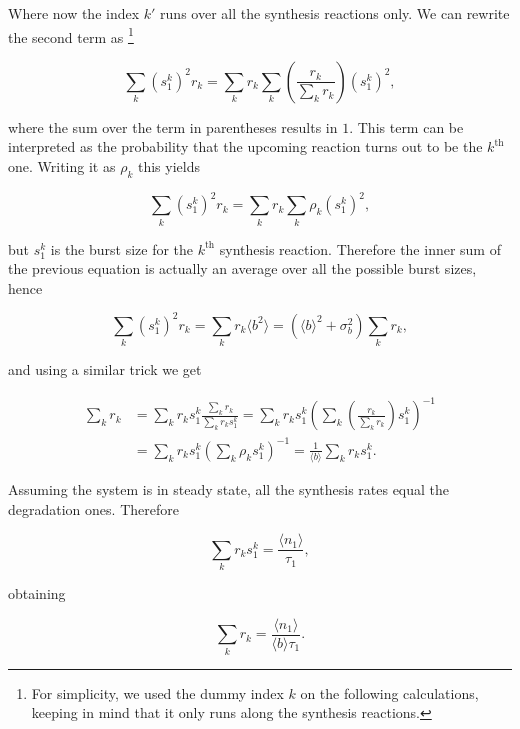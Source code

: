 Where now the index $k'$ runs over all the synthesis reactions only. We can rewrite the second term as \footnote{For simplicity, we used the dummy index $k$ on the following calculations, keeping in mind that it only runs along the synthesis reactions.}

\begin{equation*}
  \sum_k(s_1^k)^2r_k=\sum_kr_k\sum_k\left(\frac{r_k}{\sum_kr_k}\right)(s_1^k)^2,
\end{equation*}

where the sum over the term in parentheses results in $1$. This term can be interpreted as the probability that the upcoming reaction turns out to be the $k^{\text{th}}$ one. Writing it as $\rho_k$ this yields

\begin{equation*}
  \sum_k(s_1^k)^2r_k=\sum_kr_k\sum_k\rho_k(s_1^k)^2,
\end{equation*}

but $s_1^k$ is the burst size for the $k^{\text{th}}$ synthesis reaction. Therefore the inner sum of the previous equation is actually an average over all the possible burst sizes, hence

\begin{equation}
  \label{eq:mrnab4}
  \sum_k(s_1^k)^2r_k=\sum_kr_k\langle b^2 \rangle=\left(\langle b\rangle^2+\sigma_b^2\right)\sum_kr_k,
\end{equation}

and using a similar trick we get

\begin{equation*}
  \begin{split}
    \sum_kr_k&=\sum_kr_ks_1^k\frac{\sum_kr_k}{\sum_kr_ks_1^k}=\sum_kr_ks_1^k\left(\sum_k\left(\frac{r_k}{\sum_kr_k}\right)s_1^k\right)^{-1}\\
    &=\sum_kr_ks_1^k\left(\sum_k\rho_ks_1^k\right)^{-1}=\frac{1}{\langle b\rangle}\sum_kr_ks_1^k.
  \end{split}
\end{equation*}

Assuming the system is in steady state, all the synthesis rates equal the degradation ones. Therefore

\begin{equation*}
  \sum_kr_ks_1^k = \frac{\langle n_1\rangle}{\tau_1},
\end{equation*}

obtaining

\begin{equation*}
   \sum_kr_k = \frac{\langle n_1\rangle}{\langle b\rangle\tau_1}.
\end{equation*}

